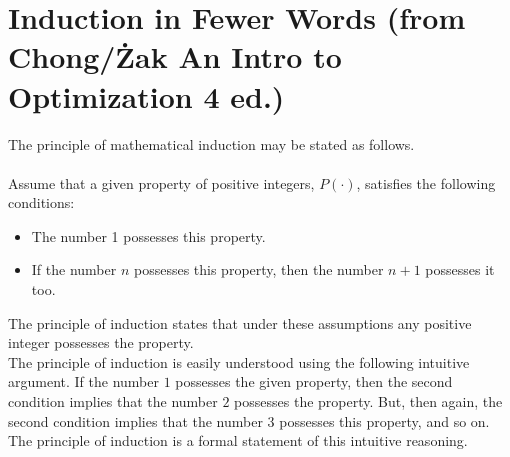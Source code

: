 \newpage
\section{Induction in Fewer Words (from Chong/\.Zak An Intro to Optimization 4 ed.)}
\label{sec:ChongInduction}
The principle of mathematical induction may be stated as follows. \\ \\
Assume that a given property of positive integers, $P(\cdot)$, satisfies the following conditions:
\begin{itemize}
    \item The number 1 possesses this property.
    \item If the number $n$ possesses this property, then the number $n + 1$ possesses it too.
\end{itemize}
The principle of induction states that under these assumptions any positive integer possesses the
property.\\

The principle of induction is easily understood using the following intuitive argument. If the number
$1$ possesses the given property, then the second condition implies that the number $2$ possesses the
property. But, then again, the second condition implies that the number $3$ possesses this property, and so on. The principle of induction is a formal statement of this intuitive reasoning.




